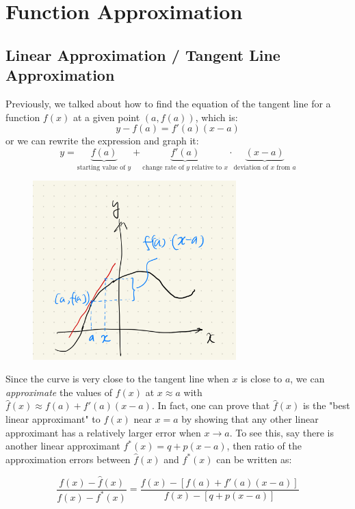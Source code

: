 \section{Function Approximation}

\subsection{Linear Approximation / Tangent Line Approximation}
Previously, we talked about how to find the equation of the tangent line for a function $f(x)$ at a given point $(a, f(a))$, which is:
\[y-f(a) = f'(a)(x-a)\]
or we can rewrite the expression and graph it:
\[y = \underbrace{f(a)}_{\text{starting value of }y} + \underbrace{f'(a)}_{\text{change rate of }y\text{ relative to }x} \cdot \underbrace{(x-a)}_{\text{deviation of }x\text{ from }a}\]

\begin{figure}[ht]
    \centering
    \includegraphics[width = 0.7\textwidth]{figures/chap 05/lin_approx_intro.png}
    \label{fig: lin_approx_intro}
\end{figure}

Since the curve is very close to the tangent line when $x$ is close to $a$, we can \textit{approximate} the values of $f(x)$ at $x \approx a$ with $\hat{f}(x) \approx f(a) + f'(a)(x-a)$.  In fact, one can prove that $\hat{f}(x)$ is the "best linear approximant" to $f(x)$ near $x=a$ by showing that any other linear approximant has a relatively larger error when $x \rightarrow a$.  To see this, say there is another linear approximant $f^*(x) = q + p(x-a)$, then ratio of the approximation errors between $\hat{f}(x)$ and $f^*(x)$ can be written as:

\[\frac{f(x)-\hat{f}(x)}{f(x) - f^*(x)} = \frac{f(x)-[f(a)+f'(a)(x-a)]}{f(x)-[q+p(x-a)]}\]

